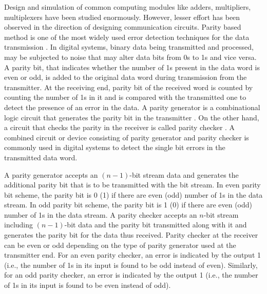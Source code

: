 \documentclass[conference]{IEEEtran}
\begin{document}
Design and simulation of common computing modules like adders, multipliers, multiplexers \cite{lent_jap1994,cho_tc2009,Mardiris_IJCTA_2010} have been studied enormously.
However, lesser effort has been observed in the direction of designing communication circuits.
Parity based method is one of the most widely used error detection techniques for the data transmission \cite{Mano_DigitalBook}.
In digital systems, binary data being transmitted and processed, may be subjected to noise that may alter data bits from 0s to 1s and vice versa.
A parity bit, that indicates whether the number of 1s present in the data word is even or odd, is added to the original data word during transmission from the transmitter.
At the receiving end, parity bit of the received word is counted by counting the number of 1s in it and is compared with the transmitted one to detect the presence of an error in the data.
A parity generator is a combinational logic circuit that generates the parity bit in the transmitter \cite{Mano_DigitalBook}.
On the other hand, a circuit that checks the parity in the receiver is called parity checker \cite{Mano_DigitalBook}.
A combined circuit or device consisting of parity generator and parity checker is commonly used in digital systems to detect the single bit errors in the transmitted data word.

A parity generator accepts an $(n-1)$-bit stream data and generates the additional parity bit that is to be transmitted with the bit stream.
In even parity bit scheme, the parity bit is 0 (1) if there are even (odd) number of 1s in the data stream.
In odd parity bit scheme, the parity bit is 1 (0) if there are even (odd) number of 1s in the data stream.
A parity checker accepts an $n$-bit stream including $(n-1)$-bit data and the parity bit transmitted along with it and generates the parity bit for the data thus received.
Parity checker at the receiver can be even or odd depending on the type of parity generator used at the transmitter end.
For an even parity checker, an error is indicated by the output 1 (i.e., the number of 1s in its input is found to be odd instead of even).
Similarly, for an odd parity checker, an error is indicated by the output 1 (i.e., the number of 1s in its input is found to be even instead of odd). 
\end{document}
